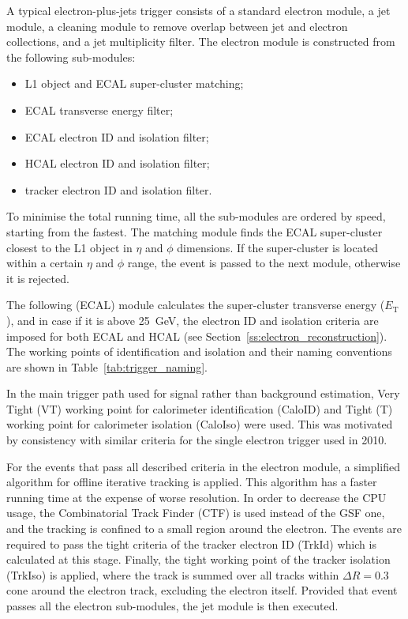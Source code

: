 A typical electron-plus-jets trigger consists of a standard electron module, a jet module, a cleaning module to remove
overlap between jet and electron collections, and a jet multiplicity filter. The electron module is constructed from the
following sub-modules:

\begin{itemize}
  \item L1 object and ECAL super-cluster matching;
  \item ECAL transverse energy filter;
  \item ECAL electron ID and isolation filter;
  \item HCAL electron ID and isolation filter;
  \item tracker electron ID and isolation filter.
\end{itemize}

To minimise the total running time, all the sub-modules are ordered by speed, starting from the fastest. The matching
module finds the ECAL super-cluster closest to the L1 object in $\eta$ and $\phi$ dimensions. If the super-cluster is
located within a certain $\eta$ and $\phi$ range, the event is passed to the next module, otherwise it is rejected.

The following (ECAL) module calculates the super-cluster transverse energy ($E_\mathrm{T}$), and in case if it is above
\SI{25}{\GeV}, the electron ID and isolation criteria are imposed for both ECAL and HCAL (see
Section~\ref{ss:electron_reconstruction}). The working points of identification and isolation and their naming
conventions are shown in Table~\ref{tab:trigger_naming}.



In the main trigger path used for signal rather than background estimation, Very Tight (VT) working point for
calorimeter identification (CaloID) and Tight (T) working point for calorimeter isolation (CaloIso) were used. This was
motivated by consistency with similar criteria for the single electron trigger used in 2010.

For the events that pass all described criteria in the electron module, a simplified algorithm for offline iterative
tracking is applied. This algorithm has a faster running time at the expense of worse resolution. In order to decrease
the CPU usage, the Combinatorial Track Finder (CTF) \autocite{CTF_tracking} is used instead of the GSF one, and the
tracking is confined to a small region around the electron. The events are required to pass the tight criteria of the
tracker electron ID (TrkId) which is calculated at this stage. Finally, the tight working point of the tracker isolation
(TrkIso) is applied, where the track \pt is summed over all tracks within $\Delta R = 0.3$ cone around the electron
track, excluding the electron itself. Provided that event passes all the electron sub-modules, the jet module is then
executed.

